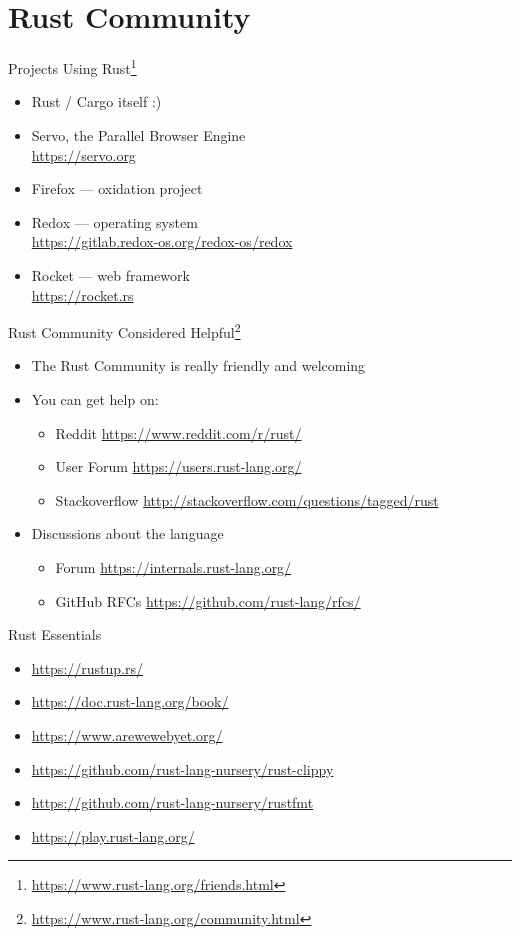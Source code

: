 \section{Rust Community}

\begin{frame}{Projects Using Rust\footnote{\url{https://www.rust-lang.org/friends.html}}}
\begin{itemize}
\item Rust / Cargo itself :)
\item Servo, the Parallel Browser Engine\\
  {\footnotesize\url{https://servo.org}}
\item Firefox --- oxidation project
\item Redox --- operating system\\
  {\footnotesize\url{https://gitlab.redox-os.org/redox-os/redox}}
\item Rocket --- web framework\\
  {\footnotesize\url{https://rocket.rs}}
\end{itemize}
\end{frame}

\begin{frame}{Rust Community Considered Helpful\footnote{\url{https://www.rust-lang.org/community.html}}}
\begin{itemize}
\item The Rust Community is really friendly and welcoming
\item You can get help on:
    \begin{itemize}
        \item Reddit {\url{https://www.reddit.com/r/rust/}}
        \item User Forum \url{https://users.rust-lang.org/}
        \item Stackoverflow \url{http://stackoverflow.com/questions/tagged/rust}
    \end{itemize}
\item Discussions about the language
    \begin{itemize}
        \item Forum \url{https://internals.rust-lang.org/}
        \item GitHub RFCs \url{https://github.com/rust-lang/rfcs/}
    \end{itemize}
\end{itemize}
\end{frame}

\begin{frame}{Rust Essentials}
\begin{itemize}
    \item \url{https://rustup.rs/}
    \item \url{https://doc.rust-lang.org/book/}
    \item \url{https://www.arewewebyet.org/}
    \item \url{https://github.com/rust-lang-nursery/rust-clippy}
    \item \url{https://github.com/rust-lang-nursery/rustfmt}
    \item \url{https://play.rust-lang.org/}
\end{itemize}
\end{frame}
